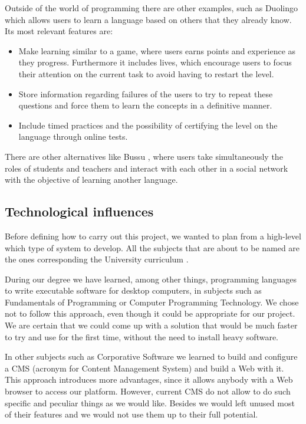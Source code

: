 Outside of the world of programming there are other examples, such as Duolingo \cite{duolingo} which allows users to learn a language based on others that they already know. Its most relevant features are:

\begin{itemize}
\item
Make learning similar to a game, where users earns points and experience as they progress. Furthermore it includes lives, which encourage users to focus their attention on the current task to avoid having to restart the level.

\item
Store information regarding failures of the users to try to repeat these questions and force them to learn the concepts in a definitive manner.

\item
Include timed practices and the possibility of certifying the level on the language through online tests.
\end{itemize}

There are other alternatives like Bussu \cite{bussu}, where users take simultaneously the roles of students and teachers and interact with each other in a social network with the objective of learning another language.

\subsection{Technological influences\label{subsec:introductionEN}}
Before defining how to carry out this project, we wanted to plan from a high-level which type of system to develop. All the subjects that are about to be named are the ones corresponding the University curriculum \cite{plan, boe}. 

During our degree we have learned, among other things, programming languages to write executable software for desktop computers, in subjects such as Fundamentals of Programming or Computer Programming Technology. We chose not to follow this approach, even though it could be appropriate for our project. We are certain that we could come up with a solution that would be much faster to try and use for the first time, without the need to install heavy software.

In other subjects such as Corporative Software we learned to build and configure a CMS (acronym for Content Management System) and build a Web with it. This approach introduces more advantages, since it allows anybody with a Web browser to access our platform. However, current CMS do not allow to do such specific and peculiar things as we would like. Besides we would left unused most of their features and we would not use them up to their full potential.

